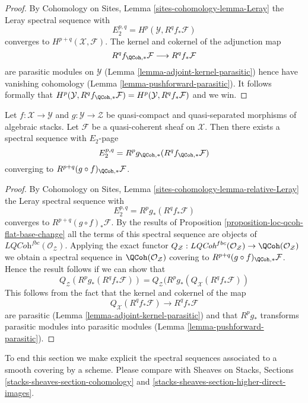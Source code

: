 \begin{proof}
By Cohomology on Sites, Lemma \ref{sites-cohomology-lemma-Leray}
the Leray spectral sequence with
$$
E_2^{p, q} = H^p(\mathcal{Y}, R^qf_*\mathcal{F})
$$
converges to $H^{p + q}(\mathcal{X}, \mathcal{F})$. The kernel and cokernel
of the adjunction map
$$
R^qf_{\QCoh, *}\mathcal{F} \longrightarrow R^qf_*\mathcal{F}
$$
are parasitic modules on $\mathcal{Y}$
(Lemma \ref{lemma-adjoint-kernel-parasitic})
hence have vanishing cohomology
(Lemma \ref{lemma-pushforward-parasitic}).
It follows formally that
$H^p(\mathcal{Y}, R^qf_{\QCoh, *}\mathcal{F}) =
H^p(\mathcal{Y}, R^qf_*\mathcal{F})$ and we win.
\end{proof}

\begin{lemma}
\label{lemma-relative-leray}
Let $f : \mathcal{X} \to \mathcal{Y}$ and $g : \mathcal{Y} \to \mathcal{Z}$
be quasi-compact and quasi-separated morphisms of algebraic stacks.
Let $\mathcal{F}$ be a quasi-coherent sheaf on $\mathcal{X}$. Then
there exists a spectral sequence with $E_2$-page
$$
E_2^{p, q} = R^pg_{\QCoh, *}(R^qf_{\QCoh, *}\mathcal{F})
$$
converging to $R^{p + q}(g \circ f)_{\QCoh, *}\mathcal{F}$.
\end{lemma}

\begin{proof}
By Cohomology on Sites, Lemma \ref{sites-cohomology-lemma-relative-Leray}
the Leray spectral sequence with
$$
E_2^{p, q} = R^pg_*(R^qf_*\mathcal{F})
$$
converges to $R^{p + q}(g \circ f)_*\mathcal{F}$. By the results of
Proposition \ref{proposition-loc-qcoh-flat-base-change}
all the terms of this spectral sequence are objects of
$\textit{LQCoh}^{fbc}(\mathcal{O}_\mathcal{Z})$. Applying the exact functor
$Q_\mathcal{Z} : \textit{LQCoh}^{fbc}(\mathcal{O}_\mathcal{Z}) \to
\QCoh(\mathcal{O}_\mathcal{Z})$ we obtain a spectral sequence in
$\QCoh(\mathcal{O}_\mathcal{Z})$ covering to
$R^{p + q}(g \circ f)_{\QCoh, *}\mathcal{F}$. Hence
the result follows if we can show that
$$
Q_\mathcal{Z}(R^pg_*(R^qf_*\mathcal{F})) =
Q_\mathcal{Z}(R^pg_*(Q_\mathcal{X}(R^qf_*\mathcal{F}))
$$
This follows from the fact that the kernel and cokernel of the map
$$
Q_\mathcal{X}(R^qf_*\mathcal{F}) \longrightarrow R^qf_*\mathcal{F}
$$
are parasitic (Lemma \ref{lemma-adjoint-kernel-parasitic}) and that
$R^pg_*$ transforms parasitic modules into parasitic modules
(Lemma \ref{lemma-pushforward-parasitic}).
\end{proof}

\noindent
To end this section we make explicit the spectral sequences
associated to a smooth covering by a scheme. Please compare with
Sheaves on Stacks, Sections \ref{stacks-sheaves-section-cohomology} and
\ref{stacks-sheaves-section-higher-direct-images}.

